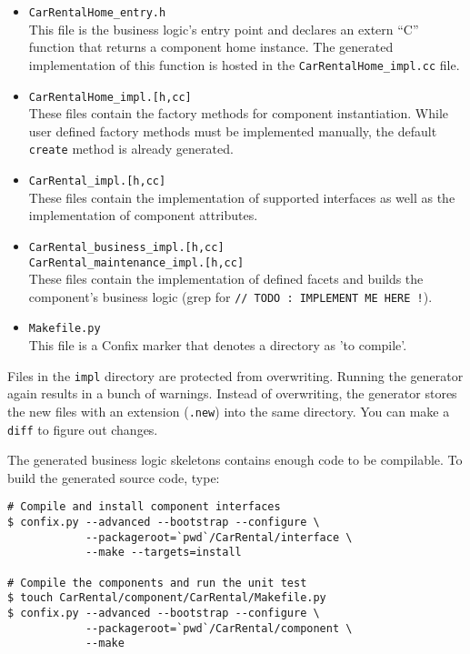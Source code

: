 \begin{itemize}
\item {\tt CarRentalHome\_entry.h} \\
This file is the business logic's entry point and declares an extern ``C'' 
function that returns a component home instance.
The generated implementation of this function is hosted in the 
{\tt CarRentalHome\_impl.cc} file.

\item {\tt CarRentalHome\_impl.[h,cc]} \\
These files contain the factory methods for component instantiation. 
While user defined factory methods must be implemented manually, the default 
{\tt create} method is already generated.

\item {\tt CarRental\_impl.[h,cc]} \\
These files contain the implementation of supported interfaces as well as the
implementation of component attributes.

\item {\tt CarRental\_business\_impl.[h,cc]} \\
{\tt CarRental\_maintenance\_impl.[h,cc]} \\
These files contain the implementation of defined facets and builds
the component's business logic
(grep for {\tt // TODO : IMPLEMENT ME HERE !}).

\item {\tt Makefile.py} \\
This file is a Confix marker that denotes a directory as 'to compile'.
\end{itemize}

Files in the {\tt impl} directory are protected from overwriting.
Running the generator again results in a bunch of warnings. 
Instead of overwriting, the generator stores the new files with an extension 
({\tt *.new}) into the same directory.
You can make a {\tt diff} to figure out changes. 

\vspace{3mm}
The generated business logic skeletons contains enough code to be compilable.
To build the generated source code, type:
\begin{small}
\begin{verbatim}
# Compile and install component interfaces
$ confix.py --advanced --bootstrap --configure \
            --packageroot=`pwd`/CarRental/interface \
            --make --targets=install

# Compile the components and run the unit test
$ touch CarRental/component/CarRental/Makefile.py
$ confix.py --advanced --bootstrap --configure \
            --packageroot=`pwd`/CarRental/component \
            --make 
\end{verbatim}
\end{small}


